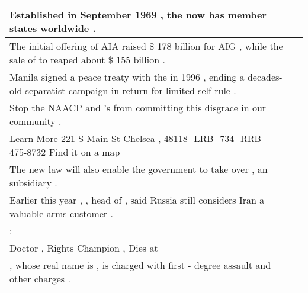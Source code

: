 \begin{longtable}{p{} P{1,3cm} }
\hline
{}  {Established in September 1969 , the \underline{} now has \underline{} member states worldwide .} &    \\ 
\hline
{}  {The initial offering of AIA raised \$ 178 billion for AIG , while the sale of \underline{} to \underline{} reaped about \$ 155 billion .} &    \\ 
\hline
{}  {Manila signed a peace treaty with the \underline{} in 1996 , ending a decades-old separatist campaign in return for limited \underline{} self-rule .} &    \\ 
\hline
{}  {Stop the NAACP and \underline{} 's \underline{} from committing this disgrace in our community .} &    \\ 
\hline
{}  {Learn More \underline{} 221 S Main St Chelsea , \underline{} 48118 -LRB- 734 -RRB- - 475-8732 Find it on a map} &    \\ 
\hline
{}  {The new law will also enable the government to take over \underline{} , an \underline{} subsidiary .} &    \\ 
\hline
{}  {Earlier this year , \underline{} , head of \underline{} , said Russia still considers Iran a valuable arms customer .} &    \\ 
\hline
{}  {\underline{} : \underline{}} &    \\ 
\hline
{}  {Doctor \underline{} , Rights Champion , Dies at \underline{}} &    \\ 
\hline
{}  {\underline{} , whose real name is \underline{} , is charged with first - degree assault and other charges .} &    \\ 

\end{longtable}
